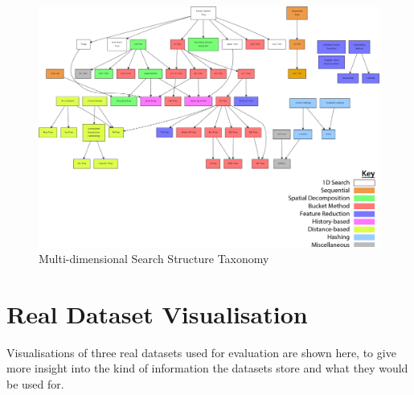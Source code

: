\begin{landscape}
	\null  %
	\nointerlineskip  %
	\vfill
	\let\snewpage \newpage
	\let\newpage \relax
		\begin{figure}[H]
			\centering
			\includegraphics[scale=0.35]{figures/md_structure_taxonomy.png}
			\caption{Multi-dimensional Search Structure Taxonomy}
			\label{fig:structure-taxonomy}
		\end{figure}
	\let \newpage \snewpage
	\vfill 
	\break %

	\newpage

\end{landscape}

\section{Real Dataset Visualisation}
\label{sec:app-real-datasets}

Visualisations of three real datasets used for evaluation are shown here, to give more insight into the kind of information the datasets store and what they would be used for.

\paragraph{}

